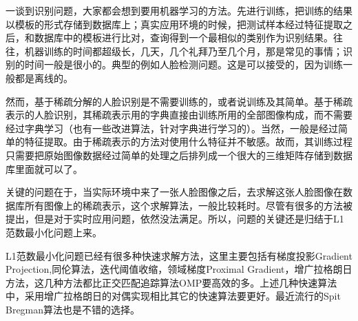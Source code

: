 \documentclass[a4paper,12pt]{article}
\begin{document}
一谈到识别问题，大家都会想到要用机器学习的方法。先进行训练，把训练的结果以模板的形式存储到数据库上；真实应用环境的时候，把测试样本经过特征提取之后，和数据库中的模板进行比对，查询得到一个最相似的类别作为识别结果。往往，机器训练的时间都超级长，几天，几个礼拜乃至几个月，那是常见的事情；识别的时间一般是很小的。典型的例如人脸检测问题。这是可以接受的，因为训练一般都是离线的。

然而，基于稀疏分解的人脸识别是不需要训练的，或者说训练及其简单。基于稀疏表示的人脸识别，其稀疏表示用的字典直接由训练所用的全部图像构成，而不需要经过字典学习（也有一些改进算法，针对字典进行学习的）。当然，一般是经过简单的特征提取。由于稀疏表示的方法对使用什么特征并不敏感。故而，其训练过程只需要把原始图像数据经过简单的处理之后排列成一个很大的三维矩阵存储到数据库里面就可以了。

关键的问题在于，当实际环境中来了一张人脸图像之后，去求解这张人脸图像在数据库所有图像上的稀疏表示，这个求解算法，一般比较耗时。尽管有很多的方法被提出，但是对于实时应用问题，依然没法满足。所以，问题的关键还是归结于L1范数最小化问题上来。

L1范数最小化问题已经有很多种快速求解方法，这里主要包括有梯度投影Gradient Projection,同伦算法，迭代阈值收缩，领域梯度Proximal Gradient，增广拉格朗日方法，这几种方法都比正交匹配追踪算法OMP要高效的多。上述几种快速算法中，采用增广拉格朗日的对偶实现相比其它的快速算法要更好。最近流行的Spit Bregman算法也是不错的选择。
\end{document}
